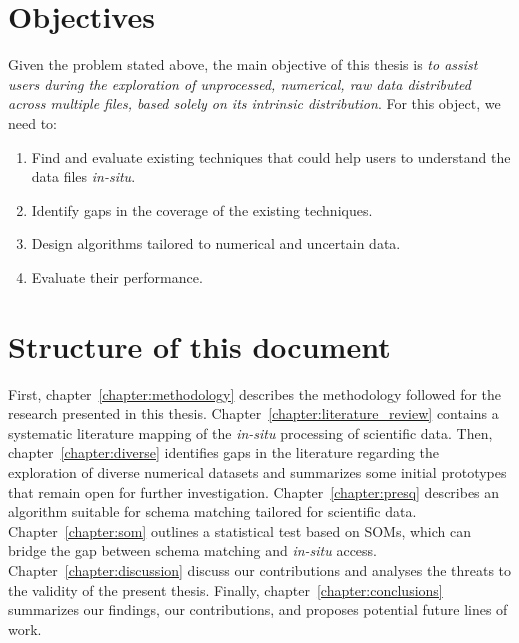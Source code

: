 \section{Objectives}
\label{sec:main_objective}

Given the problem stated above, the main objective of this
thesis is \emph{to assist users during the exploration of unprocessed,
numerical, raw data distributed across multiple files,
based solely on its intrinsic distribution}. For this
object, we need to:

\begin{enumerate}
    \item Find and evaluate existing techniques that could help users to
    understand the data files \emph{in-situ}.
    \item Identify gaps in the coverage of the existing techniques.
    \item Design algorithms tailored to numerical and uncertain data.
    \item Evaluate their performance.
\end{enumerate}
\label{enum:objectives}

\section{Structure of this document}

First, chapter~\ref{chapter:methodology} describes the methodology followed
for the research presented in this thesis.
Chapter~\ref{chapter:literature_review} contains a systematic literature mapping
of the \emph{in-situ} processing of scientific data.
Then, chapter~\ref{chapter:diverse} identifies gaps in the literature regarding
the exploration of diverse numerical datasets and summarizes some initial prototypes
that remain open for further investigation.
Chapter~\ref{chapter:presq} describes an algorithm suitable for schema matching
tailored for scientific data. Chapter~\ref{chapter:som} outlines a statistical
test based on \glspl{SOM}, which can bridge the gap between schema matching and
\emph{in-situ} access.
Chapter~\ref{chapter:discussion} discuss our contributions
and analyses the threats to the validity of the present thesis.
Finally, chapter~\ref{chapter:conclusions} summarizes our findings,
our contributions, and proposes potential future lines of work.
